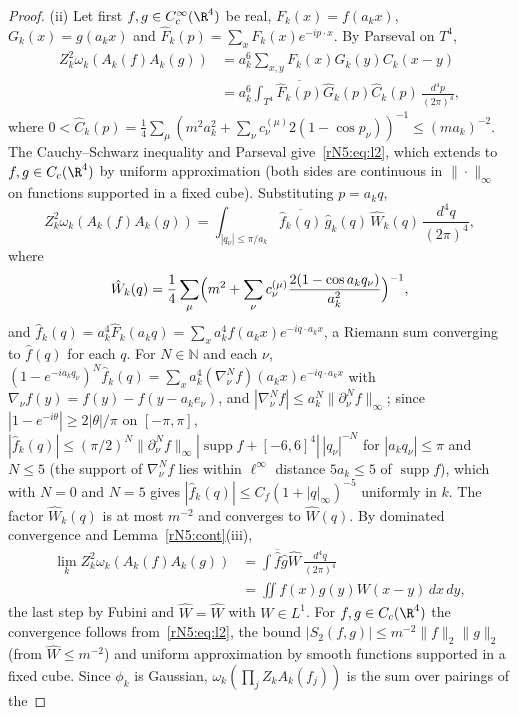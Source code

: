 \begin{proof}
(ii) Let first $f,g\in C^\infty_c(\R^4)$ be real, $F_k(x)=f(a_kx)$, $G_k(x)=
g(a_kx)$ and $\hat F_k(p)=\sum_xF_k(x)e^{-ip\cdot x}$. By Parseval on $T^4$,
\[
\begin{split}
Z_k^2\omega_k(A_k(f)A_k(g))&=a_k^6\sum_{x,y}F_k(x)G_k(y)C_k(x-y)\\
&=a_k^6\int_{T^4}\overline{\hat F_k(p)}\hat G_k(p)\hat C_k(p)\,
\frac{d^4p}{(2\pi)^4},
\end{split}
\]
where $0<\hat C_k(p)=\frac14\sum_\mu(m^2a_k^2+\sum_\nu c^{(\mu)}_\nu2(1-\cos
p_\nu))^{-1}\le(ma_k)^{-2}$. The Cauchy--Schwarz inequality and Parseval
give~\eqref{rN5:eq:l2}, which extends to $f,g\in C_c(\R^4)$ by uniform
approximation (both sides are continuous in $\|\cdot\|_\infty$ on functions
supported in a fixed cube). Substituting $p=a_kq$,
\[
Z_k^2\omega_k(A_k(f)A_k(g))=\int_{|q_\nu|\le\pi/a_k}\overline{\hat f_k(q)}\,
\hat g_k(q)\,\hat W_k(q)\,\frac{d^4q}{(2\pi)^4},
\]
where
\[
\hat W_k(q)=\frac14\sum_\mu\Bigl(m^2+\sum_\nu c^{(\mu)}_\nu\frac{2(1-\cos
a_kq_\nu)}{a_k^2}\Bigr)^{-1},
\]
and $\hat f_k(q)=a_k^4\hat F_k(a_kq)=\sum_xa_k^4f(a_kx)e^{-iq\cdot a_kx}$, a
Riemann sum converging to $\hat f(q)$ for each $q$. For $N\in\mathbb N$ and
each $\nu$, $(1-e^{-ia_kq_\nu})^N\hat f_k(q)=\sum_xa_k^4(\nabla_\nu^Nf)(a_kx)
e^{-iq\cdot a_kx}$ with $\nabla_\nu f(y)=f(y)-f(y-a_ke_\nu)$, and $|\nabla_\nu^N
f|\le a_k^N\|\partial_\nu^Nf\|_\infty$; since $|1-e^{-i\theta}|\ge2|\theta|/
\pi$ on $[-\pi,\pi]$, $|\hat f_k(q)|\le(\pi/2)^N\|\partial_\nu^Nf\|_\infty
|\operatorname{supp}f+[-6,6]^4|\,|q_\nu|^{-N}$ for $|a_kq_\nu|\le\pi$ and
$N\le5$ \textup{(}the support of $\nabla^N_\nu f$ lies within $\ell^\infty$
distance $5a_k\le5$ of $\operatorname{supp}f$\textup{)}, which
with $N=0$ and $N=5$ gives $|\hat f_k(q)|\le C_f(1+|q|_\infty)^{-5}$ uniformly
in $k$. The factor $\hat W_k(q)$ is at most $m^{-2}$ and converges to
$\hat W(q)$. By dominated convergence and Lemma~\ref{rN5:cont}(iii),
\[
\begin{split}
\lim_kZ_k^2\omega_k(A_k(f)A_k(g))&=\int\overline{\hat f}\hat g\hat W\,\frac
{d^4q}{(2\pi)^4}\\
&=\iint f(x)g(y)W(x-y)\,dx\,dy ,
\end{split}
\]
the last step by Fubini and $\widehat{W}=\hat W$ with $W\in L^1$. For
$f,g\in C_c(\R^4)$ the convergence follows from~\eqref{rN5:eq:l2}, the bound
$|S_2(f,g)|\le m^{-2}\|f\|_2\|g\|_2$ (from $\hat W\le m^{-2}$) and uniform
approximation by smooth functions supported in a fixed cube. Since $\phi_k$ is
Gaussian, $\omega_k(\prod_jZ_kA_k(f_j))$ is the sum over pairings of the

\end{proof}
